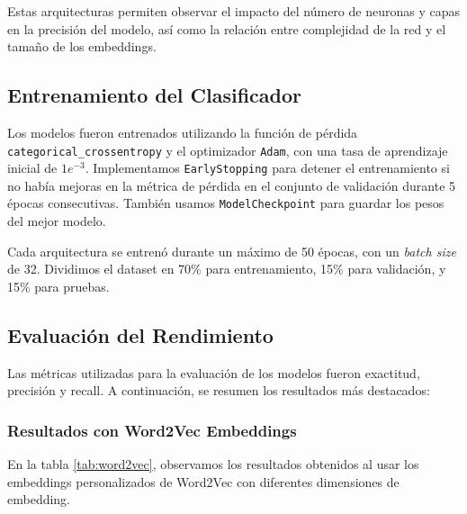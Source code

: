 \documentclass[a4]{article}
\begin{document}
Estas arquitecturas permiten observar el impacto del número de neuronas y capas en la precisión del modelo, así como la relación entre complejidad de la red y el tamaño de los embeddings.

\subsection{Entrenamiento del Clasificador}

Los modelos fueron entrenados utilizando la función de pérdida \texttt{categorical\_crossentropy} y el optimizador \texttt{Adam}, con una tasa de aprendizaje inicial de $1e^{-3}$. Implementamos \texttt{EarlyStopping} para detener el entrenamiento si no había mejoras en la métrica de pérdida en el conjunto de validación durante 5 épocas consecutivas. También usamos \texttt{ModelCheckpoint} para guardar los pesos del mejor modelo.

Cada arquitectura se entrenó durante un máximo de 50 épocas, con un \textit{batch size} de 32. Dividimos el dataset en 70\% para entrenamiento, 15\% para validación, y 15\% para pruebas.

\subsection{Evaluación del Rendimiento}

Las métricas utilizadas para la evaluación de los modelos fueron exactitud, precisión y recall. A continuación, se resumen los resultados más destacados:

\subsubsection{Resultados con Word2Vec Embeddings}

En la tabla \ref{tab:word2vec}, observamos los resultados obtenidos al usar los embeddings personalizados de Word2Vec con diferentes dimensiones de embedding.
\end{document}
